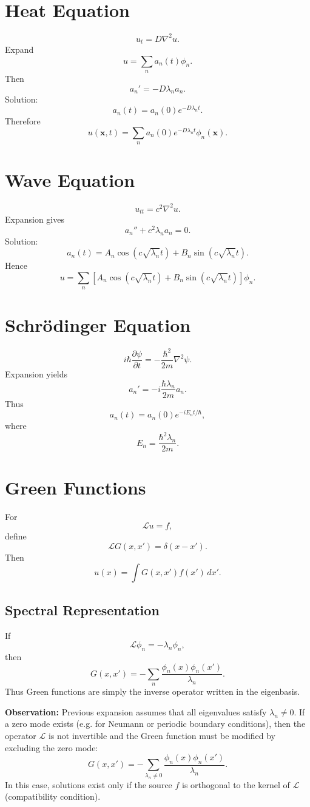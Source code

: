 \documentclass[aps,prl,twocolumn,groupedaddress]{revtex4-2}
\begin{document}
\section{Heat Equation}

$$
u_t
=
D\nabla^2u.
$$
Expand
$$
u
=
\sum_n a_n(t)\phi_n.
$$
Then
$$
a_n'
=
-D\lambda_n a_n.
$$
Solution:
$$
a_n(t)
=
a_n(0)
e^{-D\lambda_n t}.
$$
Therefore
$$
u(\mathbf x,t)
=
\sum_n
a_n(0)
e^{-D\lambda_n t}
\phi_n(\mathbf x).
$$

\section{Wave Equation}

$$
u_{tt}
=
c^2\nabla^2u.
$$
Expansion gives
$$
a_n''
+
c^2\lambda_n a_n
=
0.
$$
Solution:
$$
a_n(t)
=
A_n\cos(c\sqrt{\lambda_n}t)
+
B_n\sin(c\sqrt{\lambda_n}t).
$$
Hence
$$
u
=
\sum_n
\left[
A_n\cos(c\sqrt{\lambda_n}t)
+
B_n\sin(c\sqrt{\lambda_n}t)
\right]
\phi_n.
$$

\section{Schrödinger Equation}

$$
i\hbar\frac{\partial\psi}{\partial t}
=
-\frac{\hbar^2}{2m}
\nabla^2\psi.
$$
Expansion yields
$$
a_n'
=
-i
\frac{\hbar\lambda_n}{2m}
a_n.
$$
Thus
$$
a_n(t)
=
a_n(0)
e^{-iE_nt/\hbar},
$$
where
$$
E_n
=
\frac{\hbar^2\lambda_n}{2m}.
$$

\section{Green Functions}

For
$$
\mathcal L u=f,
$$
define
$$
\mathcal L G(x,x')
=
\delta(x-x').
$$
Then
$$
u(x)
=
\int
G(x,x')
f(x')\,dx'.
$$

\subsection{Spectral Representation}

If
$$
\mathcal L\phi_n
=
-\lambda_n\phi_n,
$$
then
$$
G(x,x')
=
-\sum_n
\frac{\phi_n(x)\phi_n(x')}
{\lambda_n}.
$$
Thus Green functions are simply the inverse operator written in the eigenbasis.

{\bf Observation:}
Previous expansion assumes that all eigenvalues satisfy $\lambda_n\neq 0$.
If a zero mode exists (e.g. for Neumann or periodic boundary conditions), then the operator $\mathcal L$ is not invertible and the Green function must be modified by excluding the zero mode:
$$
G(x,x')
=
-\sum_{\lambda_n\neq0}
\frac{\phi_n(x)\phi_n(x')}
{\lambda_n}.
$$
In this case, solutions exist only if the source $f$ is orthogonal to the kernel of $\mathcal L$ (compatibility condition).
\end{document}
